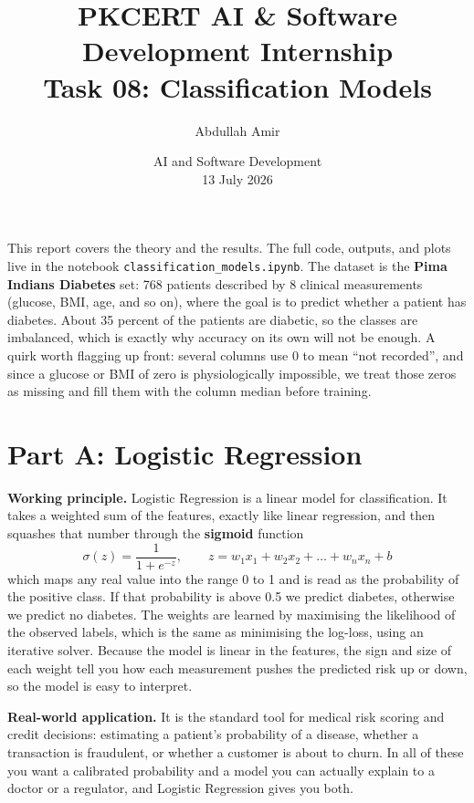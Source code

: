 \documentclass[11pt,a4paper]{article}
\title{\vspace{-1.5cm}\textbf{PKCERT AI \& Software Development Internship \\ Task 08: Classification Models}}
\author{Abdullah Amir}
\date{AI and Software Development \\ 13 July 2026}
\begin{document}
\maketitle
\vspace{-0.8cm}

This report covers the theory and the results. The full code, outputs, and plots
live in the notebook \texttt{classification\_models.ipynb}. The dataset is the
\textbf{Pima Indians Diabetes} set: 768 patients described by 8 clinical
measurements (glucose, BMI, age, and so on), where the goal is to predict whether
a patient has diabetes. About 35 percent of the patients are diabetic, so the
classes are imbalanced, which is exactly why accuracy on its own will not be
enough. A quirk worth flagging up front: several columns use 0 to mean ``not
recorded'', and since a glucose or BMI of zero is physiologically impossible, we
treat those zeros as missing and fill them with the column median before training.

\section*{Part A: Logistic Regression}

\textbf{Working principle.} Logistic Regression is a linear model for
classification. It takes a weighted sum of the features, exactly like linear
regression, and then squashes that number through the \textbf{sigmoid} function
\[ \sigma(z) = \frac{1}{1 + e^{-z}}, \qquad z = w_1 x_1 + w_2 x_2 + \dots + w_n x_n + b \]
which maps any real value into the range 0 to 1 and is read as the probability of
the positive class. If that probability is above 0.5 we predict diabetes,
otherwise we predict no diabetes. The weights are learned by maximising the
likelihood of the observed labels, which is the same as minimising the log-loss,
using an iterative solver. Because the model is linear in the features, the sign
and size of each weight tell you how each measurement pushes the predicted risk up
or down, so the model is easy to interpret.

\textbf{Real-world application.} It is the standard tool for medical risk scoring
and credit decisions: estimating a patient's probability of a disease, whether a
transaction is fraudulent, or whether a customer is about to churn. In all of
these you want a calibrated probability and a model you can actually explain to a
doctor or a regulator, and Logistic Regression gives you both.
\end{document}
